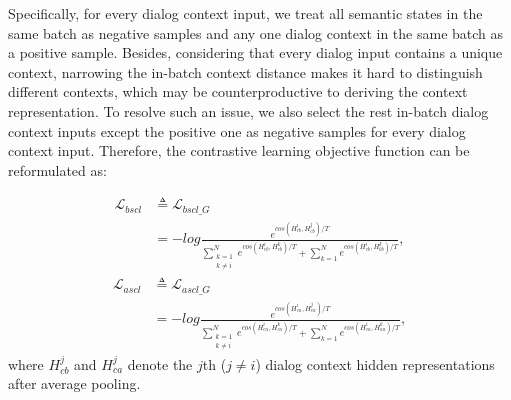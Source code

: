 Specifically, for every dialog context input, we treat all semantic states in the same batch as negative samples and any one dialog context in the same batch as a positive sample.
Besides, considering that every dialog input contains a unique context, narrowing the in-batch context distance makes it hard to distinguish different contexts, which may be counterproductive to deriving  the context representation. To resolve such an issue, we also select the rest in-batch dialog context inputs except the positive one as negative samples for every dialog context input.
Therefore,  the contrastive learning objective function can be reformulated as:

{\footnotesize
\setlength{\abovedisplayskip}{0.005cm}
\setlength{\belowdisplayskip}{0.005cm}
\begin{equation}
\begin{aligned}
\mathcal{L}_{bscl} &\triangleq \mathcal{L}_{bscl\_G}\\&= -log \frac{e^{cos(H_{cb}^i, H_{cb}^j)/T}}{\sum\limits_{\substack{k=1\\k\neq i}}^{N}\! e^{cos(H_{cb}^i,H_{cb}^k)/T} \!+ \!\sum\limits_{k=1}^{N}\! e^{cos(H_{cb}^i,H_{bb}^k)/T}},
\end{aligned}
\end{equation}%
\begin{equation}
\begin{aligned}
\mathcal{L}_{ascl} &\triangleq \mathcal{L}_{ascl\_G}\\&= -log \frac{e^{cos(H_{ca}^i, H_{ca}^j)/T}}{\sum\limits_{\substack{k=1\\k\neq i}}^{N}\! e^{cos(H_{ca}^i,H_{ca}^k)/T} \!+ \!\sum\limits_{k=1}^{N}\! e^{cos(H_{ca}^i,H_{aa}^k)/T}},
\end{aligned}
\end{equation}}%
where $H_{cb}^j$ and $H_{ca}^j$ denote the $j$th ($j \neq i$) dialog context hidden representations after average pooling.

